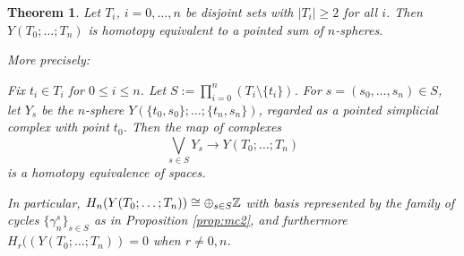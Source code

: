 \documentclass[12pt]{amsart}
\newtheorem{thm}[lem]{Theorem}
\theoremstyle{definition}
\newcommand{\Z}{\Bbb{Z}}
\newcommand{\<}{\langle}
\renewcommand{\>}{\rangle}
\begin{document}
\begin{thm}\label{thm:spheresum} Let $T_i$, $i=0,\ldots,n$ be disjoint sets with $|T_i|\geq 2$ for all $i$. Then $Y(T_0;\ldots ;T_n)$ is homotopy equivalent to a pointed sum 
of $n$-spheres.

More precisely:  

Fix $t_i\in T_i$ for $0\leq i\leq n$.  Let $S:=\prod_{i=0}^n(T_i\setminus\{ t_i\})$.
For $s=(s_0,\ldots,s_n)\in S$, let $Y_s$
be the $n$-sphere 
$Y(\{ t_0,s_0\};\ldots ;\{ t_n,s_n\})$, regarded as a pointed simplicial complex with point $t_0$. Then the map of complexes
\[
\bigvee_{s\in S}Y_s \longrightarrow Y(T_0;\ldots;T_n)
\]
is a homotopy equivalence of spaces.

 In particular, $H_n(Y(T_0;\ldots;T_n))\cong \oplus_{s\in S}\Z$ with basis represented by the family of cycles 
$\{ \gamma^{s}_n\}_{s\in S}$ as in Proposition \ref{prop:mc2}, and furthermore $H_r((Y(T_0;\ldots;T_n))=0$ when $r\not=0,n$.
\end{thm}
\end{document}

